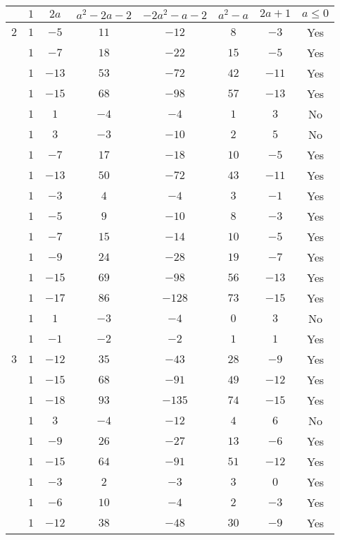 \documentclass{amsart}
\theoremstyle{plain}
\theoremstyle{definition}
\theoremstyle{remark}
\begin{document}
\begin{small}
\begin{longtable}{|c||c|c|c|c|c|c|c|}
& $1$ & $2a$ & $a^2-2a-2$ & $-2a^2-a-2$ & $a^2-a$ & $2a+1$ & $a\leq 0$ \\ \hline
$2$ & $1$ & $-5$ & $11$ & $-12$ & $8$ & $-3$ & Yes \\ \cline{2-8}
& $1$ & $-7$ & $18$ & $-22$ & $15$ & $-5$ & Yes \\ \cline{2-8}
& $1$ & $-13$ & $53$ & $-72$ & $42$ & $-11$ & Yes \\ \cline{2-8}
& $1$ & $-15$ & $68$ & $-98$ & $57$ & $-13$ & Yes \\ \cline{2-8}
& $1$ & $1$ & $-4$ & $-4$ & $1$ & $3$ & No \\ \cline{2-8}
& $1$ & $3$ & $-3$ & $-10$ & $2$ & $5$ & No \\ \cline{2-8}
& $1$ & $-7$ & $17$ & $-18$ & $10$ & $-5$ & Yes \\ \cline{2-8}
& $1$ & $-13$ & $50$ & $-72$ & $43$ & $-11$ & Yes \\ \cline{2-8}
& $1$ & $-3$ & $4$ & $-4$ & $3$ & $-1$ & Yes \\ \cline{2-8}
& $1$ & $-5$ & $9$ & $-10$ & $8$ & $-3$ & Yes \\ \cline{2-8}
& $1$ & $-7$ & $15$ & $-14$ & $10$ & $-5$ & Yes \\ \cline{2-8}
& $1$ & $-9$ & $24$ & $-28$ & $19$ & $-7$ & Yes \\ \cline{2-8}
& $1$ & $-15$ & $69$ & $-98$ & $56$ & $-13$ & Yes \\ \cline{2-8}
& $1$ & $-17$ & $86$ & $-128$ & $73$ & $-15$ & Yes \\ \cline{2-8}
& $1$ & $1$ & $-3$ & $-4$ & $0$ & $3$ & No \\ \cline{2-8}
& $1$ & $-1$ & $-2$ & $-2$ & $1$ & $1$ & Yes \\ \hline
$3$ & $1$ & $-12$ & $35$ & $-43$ & $28$ & $-9$ & Yes \\ \cline{2-8}
& $1$ & $-15$ & $68$ & $-91$ & $49$ & $-12$ & Yes \\ \cline{2-8}
& $1$ & $-18$ & $93$ & $-135$ & $74$ & $-15$ & Yes \\ \cline{2-8}
& $1$ & $3$ & $-4$ & $-12$ & $4$ & $6$ & No \\ \cline{2-8}
& $1$ & $-9$ & $26$ & $-27$ & $13$ & $-6$ & Yes \\ \cline{2-8}
& $1$ & $-15$ & $64$ & $-91$ & $51$ & $-12$ & Yes \\ \cline{2-8}
& $1$ & $-3$ & $2$ & $-3$ & $3$ & $0$ & Yes \\ \cline{2-8}
& $1$ & $-6$ & $10$ & $-4$ & $2$ & $-3$ & Yes \\ \cline{2-8}
& $1$ & $-12$ & $38$ & $-48$ & $30$ & $-9$ & Yes \\ \cline{2-8}

\end{longtable}
\end{small}
\end{document}
